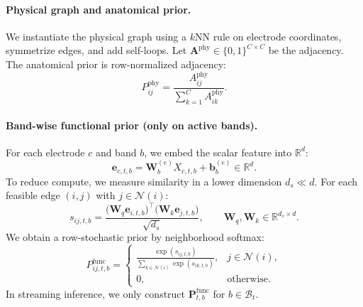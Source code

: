 \documentclass[preprint,12pt]{elsarticle}
\begin{document}
\paragraph{Physical graph and anatomical prior.}
We instantiate the physical graph using a $k$NN rule on electrode coordinates, symmetrize edges, and add self-loops.
Let $\mathbf{A}^{\mathrm{phy}}\in\{0,1\}^{C\times C}$ be the adjacency.
The anatomical prior is row-normalized adjacency:
\begin{equation}
P^{\mathrm{phy}}_{ij}
=
\frac{A^{\mathrm{phy}}_{ij}}{\sum_{k=1}^{C}A^{\mathrm{phy}}_{ik}}.
\label{eq:phy_norm}
\end{equation}

\paragraph{Band-wise functional prior (only on active bands).}
\label{sec:method_func}
For each electrode $c$ and band $b$, we embed the scalar feature into $\mathbb{R}^{d}$:
\begin{equation}
\mathbf{e}_{c,t,b}
=
\mathbf{W}^{(e)}_b X_{c,t,b}+\mathbf{b}^{(e)}_b
\in \mathbb{R}^{d}.
\label{eq:band_embed}
\end{equation}
To reduce compute, we measure similarity in a lower dimension $d_s\ll d$.
For each feasible edge $(i,j)$ with $j\in\mathcal{N}(i)$:
\begin{equation}
s_{ij,t,b}
=
\frac{\big(\mathbf{W}_q\mathbf{e}_{i,t,b}\big)^\top\big(\mathbf{W}_k\mathbf{e}_{j,t,b}\big)}{\sqrt{d_s}},
\qquad
\mathbf{W}_q,\mathbf{W}_k\in\mathbb{R}^{d_s\times d}.
\label{eq:similarity_small}
\end{equation}
We obtain a row-stochastic prior by neighborhood softmax:
\begin{equation}
P^{\mathrm{func}}_{ij,t,b}
=
\begin{cases}
\displaystyle\frac{\exp(s_{ij,t,b})}{\sum_{k\in\mathcal{N}(i)}\exp(s_{ik,t,b})}, & j\in\mathcal{N}(i),\\[6pt]
0, & \text{otherwise}.
\end{cases}
\label{eq:P_func_band}
\end{equation}
In streaming inference, we only construct $\mathbf{P}^{\mathrm{func}}_{t,b}$ for $b\in\mathcal{B}_t$.
\end{document}
